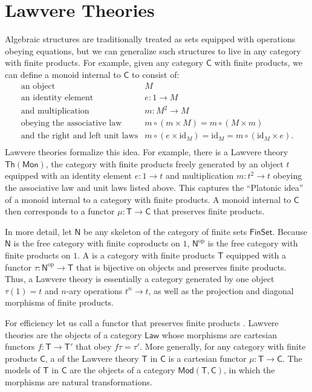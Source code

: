 \documentclass{amsart}
\newcommand{\define}[1]{{\bf \boldmath{#1}}}
\theoremstyle{definition}
\newcommand{\Th}{\mathsf{Th}}
\newcommand{\Law}{\mathsf{Law}}
\newcommand{\Mon}{\mathsf{Mon}}
\newcommand{\Mod}{\mathsf{Mod}}
\newcommand{\FinSet}{\mathsf{FinSet}}
\newcommand{\NN}{\mathsf{N}}
\newcommand{\C}{\mathsf{C}}
\newcommand{\T}{\mathsf{T}}
\newcommand{\op}{\mathrm{op}}
\newcommand{\maps}{\colon}
\newcommand{\id}{\mathrm{id}}
\begin{document}
\section{Lawvere Theories}
\label{sec:lawvere}

Algebraic structures are traditionally treated as sets equipped with operations obeying equations, but we can generalize such structures to live in any category with finite products.  For example,
given any category $\C$ with finite products, we can define a monoid internal to $\C$ to consist of:
\[\begin{array}{rl}
\text{an object} & M\\
\text{an identity element} & e\maps 1 \to M\\
\text{and multiplication} & m\maps M^2 \to M\\
\text{obeying the associative law} & m \circ (m \times M) = m \circ (M \times m)\\
\text{and the right and left unit laws} & m \circ (e  \times \id_M) = \id_M = m \circ (\id_M \times e).\\
\end{array}\]
Lawvere theories formalize this idea.  For example, there is a Lawvere theory $\Th(\Mon)$, the category with finite products freely generated by an object $t$ equipped with an identity element $e \maps 1 \to t$ and multiplication $m \maps t^2 \to t$ obeying the associative law and unit laws listed above.    This captures the ``Platonic idea'' of a monoid internal to a category with finite products.  A monoid internal to $\C$ then corresponds to a functor $\mu \maps \T \to \C$ that preserves finite products.  

In more detail, let $\NN$ be any skeleton of the category of finite sets $\FinSet$.  Because $\NN$ is the free category with finite coproducts on $1$, $\NN^\op$ is the free category with finite products on $1$.   A \define{Lawvere theory} is a category with finite products $\T$ equipped with a functor $\tau \maps \NN^\op \to \T$ that is bijective on objects and preserves finite products.   Thus, a Lawvere theory is essentially a category generated by one object $\tau(1) = t$ and $n$-ary operations $t^n \to t$, as well as the projection and diagonal morphisms of finite products.

For efficiency let us call a functor that preserves finite products \define{cartesian}.   Lawvere theories are the objects of a category $\Law$ whose morphisms are cartesian functors $f \maps \T\to \T'$ that obey $f\tau = \tau'$.   More generally, for any category with finite products $\C$, a \define{model} of the Lawvere theory $\T$ in $\C$ is a cartesian functor $\mu \maps \T \to \C$.  The models of $\T$ in $\C$ are the objects of a category $\Mod(\T,\C)$, in which the morphisms are natural transformations.  
\end{document}
